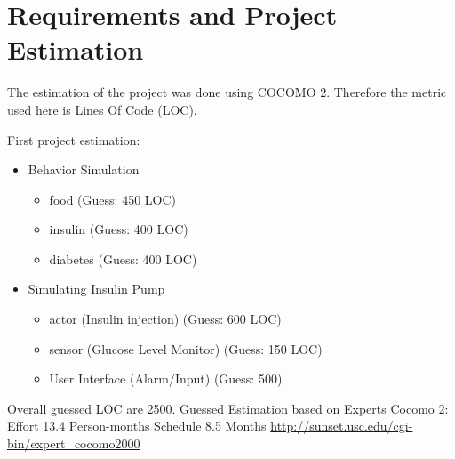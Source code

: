 \section{Requirements and Project Estimation}
The estimation of the project was done using COCOMO 2.
Therefore the metric used here is Lines Of Code (LOC).

First project estimation:
\begin{itemize}
  \item Behavior Simulation
  	\begin{itemize}
        \item food (Guess: 450 LOC)
        \item insulin (Guess: 400 LOC)
        \item diabetes (Guess: 400 LOC)
    \end{itemize}
  \item Simulating Insulin Pump
  	\begin{itemize}
        \item actor (Insulin injection) (Guess: 600 LOC)
        \item sensor (Glucose Level Monitor) (Guess: 150 LOC)
        \item User Interface (Alarm/Input) (Guess: 500)
    \end{itemize}
\end{itemize} 
Overall guessed LOC are 2500.
Guessed Estimation based on Experts Cocomo 2:
Effort 13.4 Person-months
Schedule 8.5 Months
\url{http://sunset.usc.edu/cgi-bin/expert_cocomo2000}

